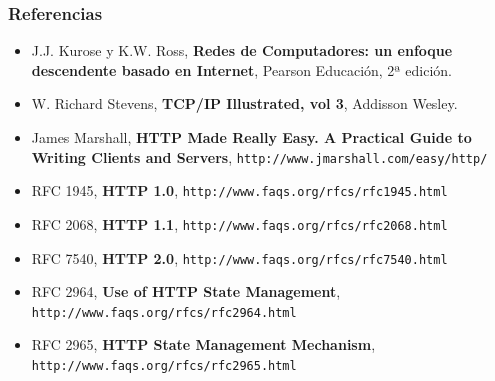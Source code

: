 \documentclass[hyperref={pdfpagelabels=true},ucs]{beamer}
\begin{document}
\begin{frame}[fragile,shrink=8]
\frametitle{Referencias}


\begin{itemize}

\item J.J. Kurose y K.W. Ross, \textbf{Redes de Computadores: un
    enfoque descendente basado en Internet}, Pearson Educación, 2ª
  edición.

\item W. Richard Stevens, \textbf{TCP/IP Illustrated, vol 3}, Addisson
  Wesley.

\item James Marshall, \textbf{HTTP Made Really Easy. A Practical Guide to Writing Clients and Servers}, \Verb|http://www.jmarshall.com/easy/http/|

\item RFC 1945, \textbf{HTTP 1.0},
  \verb|http://www.faqs.org/rfcs/rfc1945.html| 
\item RFC 2068, \textbf{HTTP 1.1},
  \verb|http://www.faqs.org/rfcs/rfc2068.html| 
\item RFC 7540, \textbf{HTTP 2.0},
  \verb|http://www.faqs.org/rfcs/rfc7540.html| 
\item RFC 2964, \textbf{Use of HTTP State Management},
  \verb|http://www.faqs.org/rfcs/rfc2964.html| 
\item RFC 2965, \textbf{HTTP State Management Mechanism},
  \verb|http://www.faqs.org/rfcs/rfc2965.html| 


\end{itemize}

\end{frame}


\end{document}
